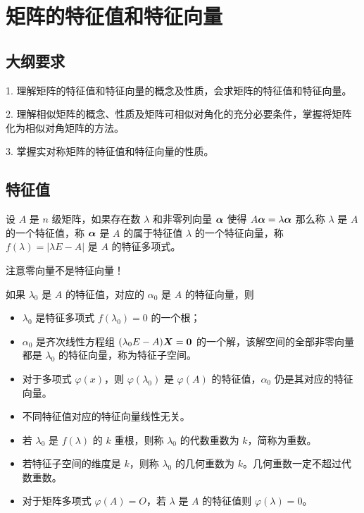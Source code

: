 \section{矩阵的特征值和特征向量}

\subsection{大纲要求}

1. 理解矩阵的特征值和特征向量的概念及性质，会求矩阵的特征值和特征向量。

2. 理解相似矩阵的概念、性质及矩阵可相似对角化的充分必要条件，掌握将矩阵化为相似对角矩阵的方法。

3. 掌握实对称矩阵的特征值和特征向量的性质。

\subsection{特征值}

\begin{definition}
	设 $A$ 是 $n$ 级矩阵，如果存在数 $\lambda$ 和非零列向量 $\boldsymbol{\alpha}$ 使得 $A \boldsymbol{\alpha} = \lambda\boldsymbol{\alpha}$ 那么称 $\lambda$ 是 $A$ 的一个特征值，称 $\boldsymbol{\alpha}$ 是 $A$ 的属于特征值 $\lambda$ 的一个特征向量，称 $f(\lambda) = |\lambda E - A|$ 是 $A$ 的特征多项式。
\end{definition}

\begin{note}
	注意零向量不是特征向量！
\end{note}

如果 $\lambda_0$ 是 $A$ 的特征值，对应的 $\alpha_0$ 是 $A$ 的特征向量，则
\begin{itemize}
	\item $\lambda_0$ 是特征多项式 $f(\lambda_0) = 0$ 的一个根；
	\item $\alpha_0$ 是齐次线性方程组 $(\lambda_0 E - A) \boldsymbol{X} = \boldsymbol{0}$ 的一个解，该解空间的全部非零向量都是 $\lambda_0$ 的特征向量，称为特征子空间。
	\item 对于多项式 $\varphi(x)$，则 $\varphi(\lambda_0)$ 是 $\varphi(A)$ 的特征值，$\alpha_0$ 仍是其对应的特征向量。
	\item 不同特征值对应的特征向量线性无关。
	\item 若 $\lambda_0$ 是 $f(\lambda)$ 的 $k$ 重根，则称 $\lambda_0$ 的代数重数为 $k$，简称为重数。
	\item 若特征子空间的维度是 $k$，则称 $\lambda_0$ 的几何重数为 $k$。几何重数一定不超过代数重数。
	\item 对于矩阵多项式 $\varphi(A) = O$，若 $\lambda$ 是 $A$ 的特征值则 $\varphi(\lambda) = 0$。
\end{itemize}

